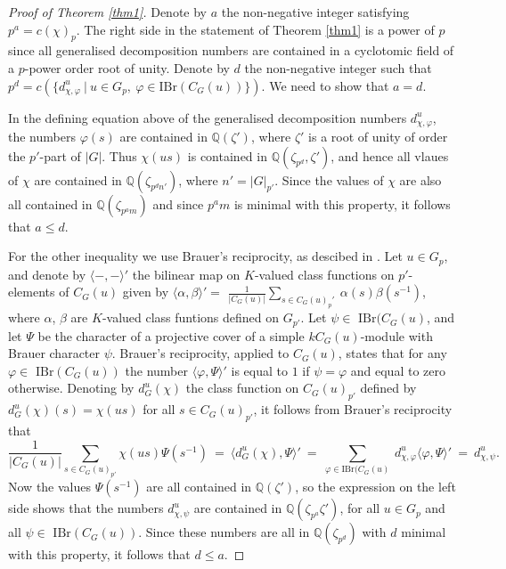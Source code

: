 \documentclass{amsart} %
\theoremstyle{plain}\newtheorem{Theorem}{Theorem}[section]
\theoremstyle{plain}\newtheorem{Conjecture}[Theorem]{Conjecture}
\theoremstyle{plain}\newtheorem{Corollary}[Theorem]{Corollary}
\theoremstyle{plain}\newtheorem{Lemma}[Theorem]{Lemma}
\theoremstyle{plain}\newtheorem{Proposition}[Theorem]{Proposition}
\theoremstyle{definition}\newtheorem{Definition}[Theorem]{Definition}
\theoremstyle{definition}\newtheorem{Example}[Theorem]{Example}
\theoremstyle{definition}\newtheorem{Examples}[Theorem]{Examples}
\theoremstyle{definition}\newtheorem{Remark}[Theorem]{Remark}
\theoremstyle{definition}\newtheorem{Remarks}[Theorem]{Remarks}
\theoremstyle{plain}\newtheorem{Statement}[Theorem]{}
\def\Q{{\mathbb Q}}               \def\bV{\mathbf{V}}
\def\IBr{\mathrm{IBr}}
\begin{document}
\begin{proof}[Proof of Theorem \ref{thm1}]
Denote by $a$ the non-negative integer satisfying $p^a=c(\chi)_p$.  
The right side in the statement of Theorem \ref{thm1}  is  a power of $p$ 
since all generalised  decomposition numbers are contained in a cyclotomic 
field  of a $p$-power  order root of unity. Denote by $d$ the non-negative integer
such that $p^d= c\left(\{d^u_{\chi,\varphi}\ |\ u\in G_p,\ \varphi\in\IBr(C_G(u))\}\right)$.
We need to show that $a=d$. 

In  the defining equation above of the 
generalised decomposition numbers $d^u_{\chi, \varphi}$, the numbers
$\varphi(s)$ are contained in $\Q(\zeta')$, where $\zeta'$ is a root of unity
of order the $p'$-part of $|G|$. Thus $\chi(us)$ is contained in
$\Q(\zeta_{p^d}, \zeta')$, and hence all  vlaues of $\chi$ are
contained in $\Q(\zeta_{p^dn'})$, where $n'=|G|_{p'}$. 
Since the  values of $\chi$ are also all contained in $\Q(\zeta_{p^am})$
and since $p^am$ is minimal  with this property, it follows that $a\leq d$.

For the other inequality we use Brauer's reciprocity, as descibed in 
\cite[5.14.7, 5.14.8]{LiBookI}. 
Let $u\in G_p$, and denote by $\langle -, -\rangle'$ the
bilinear map on $K$-valued class functions on $p'$-elements of $C_G(u)$ given by
$\langle \alpha, \beta\rangle'=$ $\frac{1}{|C_G(u)|} \sum_{s\in C_G(u)_p'} \ 
\alpha(s)\beta(s^{-1})$, where $\alpha$, $\beta$ are $K$-valued class funtions
defined on $G_{p'}$. Let $\psi\in$ $\IBr(C_G(u)$, and let $\Psi$ be the character
of a projective cover of a simple $kC_G(u)$-module with Brauer character $\psi$.
Brauer's reciprocity, applied to $C_G(u)$, states that for any $\varphi\in$ $\IBr(C_G(u))$ 
the number $\langle \varphi, \Psi\rangle'$ is equal to $1$ if $\psi=\varphi$ and equal to
zero otherwise. Denoting by $d^u_G(\chi)$ the class function on $C_G(u)_{p'}$
defined by $d^u_G(\chi)(s)=\chi(us)$ for all $s\in C_G(u)_{p'}$, it follows from
Brauer's reciprocity that
$$\frac{1}{|C_G(u)|} \sum_{s\in C_G(u)_{p'}} \chi(us) \Psi(s^{-1})\ = \
\langle d^u_G(\chi), \Psi\rangle'\ =\ 
\sum_{\varphi\in\IBr(C_G(u)}\ d^u_{\chi,\varphi} \langle \varphi, \Psi\rangle'\ = \
d^u_{\chi,\psi}.$$
Now the values $\Psi(s^{-1})$ are all contained in $\Q(\zeta')$, so the expression
on the left side shows that the numbers
$d^u_{\chi,\psi}$ are contained in $\Q(\zeta_{p^a}\zeta')$, for
all $u\in G_p$ and all $\psi\in$ $\IBr(C_G(u))$. Since these numbers are all
in $\Q(\zeta_{p^d})$ with $d$ minimal with this property, it follows that
$d\leq a$. 
\end{proof}
\end{document}

